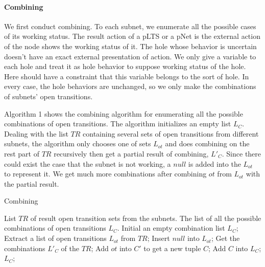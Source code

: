\documentclass{lncs/llncs}
\newcommand{\QIN}[1]{\textcolor{airforceblue}{#1}}
\begin{document}
\paragraph{Combining}
\QIN{
We first conduct combining. To each subnet, we enumerate all the possible cases of its working status. The result action of a pLTS or a pNet is the external action of the node shows the working status of it. The hole whose behavior is uncertain doesn't have an exact external presentation of action. We only give a variable to each hole and treat it as hole behavior to suppose working status of the hole. Here should have a constraint that this variable belongs to the sort of hole. In every case, the hole behaviors are unchanged, so we only make the combinations of subnets' open transitions.
}

\QIN{
Algorithm 1 shows the combining algorithm for enumerating all the possible combinations of open transitions. The algorithm initializes an empty list $L_C$. Dealing with the list $TR$ containing several sets of open transitions from different subnets, the algorithm only chooses one of sets $L_{ot}$ and does combining on the rest part of $TR$ recursively then get a partial result of combining, $L'_C$. Since there could exist the case that the subnet is not working, a $null$ is added into the $L_{ot}$ to represent it. We get much more combinations after combining $ot$ from $L_{ot}$ with the partial result. 
}

\begin{algorithm}
\caption{Combining}
\begin{algorithmic}[1]

\Require List $TR$ of result open transition sets from the subnets. 
\Ensure The list of all the possible combinations of open transitions $L_C$.
\State Initial an empty combination list $L_C$;
\State Extract a list of open transitions $L_{ot}$ from $TR$;
\State Insert $null$ into $L_{ot}$;
\State Get the combinations $L'_C$ of the $TR$;
		\State Add $ot$ into $C'$ to get a new tuple $C$;
		\State Add $C$ into $L_C$;
	\EndFor
\EndFor 
\State \Return $L_C$;

\end{algorithmic}  
\end{algorithm}
\end{document}
